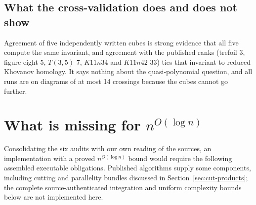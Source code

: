 \documentclass[11pt]{article}
\theoremstyle{remark}
\newcommand{\qp}{n^{O(\log n)}}
\begin{document}
\subsection{What the cross-validation does and does not show}
Agreement of five independently written cubes is strong evidence that all
five compute the same invariant, and agreement with the published ranks
(trefoil 3, figure-eight 5, $T(3,5)$ 7, $K11n34$ and $K11n42$ 33) ties that
invariant to reduced Khovanov homology. It says nothing about the
quasi-polynomial question, and all runs are on diagrams of at most 14
crossings because the cubes cannot go further.

\section{What is missing for \texorpdfstring{$\qp$}{n\^{}O(log n)}}
\label{sec:missing}
Consolidating the six audits with our own reading of the sources, an
implementation with a proved $\qp$ bound would require the following
assembled executable obligations. Published algorithms supply some components,
including cutting and parallelity bundles discussed in
Section~\ref{sec:cut-products}; the complete source-authenticated integration
and uniform complexity bounds below are not implemented here.
\end{document}
